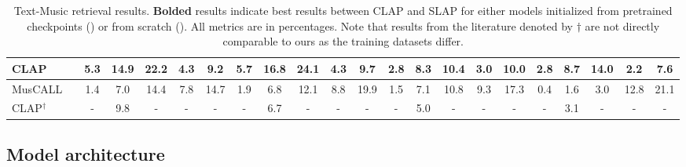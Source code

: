 \documentclass{article}
\newcommand{\redcross}{\textcolor{red}{\ding{55}}} %
\newcommand{\greencheck}{\textcolor{green}{\ding{51}}} %
\begin{document}
\begin{table}[t]
{\begin{tabular}{lcccccccccccccccccccccc}
CLAP &     \greencheck       &  & 5.3 & 14.9  & 22.2 &  4.3   & \multicolumn{1}{c|}{9.2} & 5.7 & 16.8 & 24.1 &  4.3   & \multicolumn{1}{c|}{\textbf{9.7}} & 2.8 & 8.3 &     10.4 &  3.0   & \multicolumn{1}{c|}{10.0}     & 2.8  & 8.7 & 14.0 & 2.2 & \textbf{7.6} \\
\midrule
\multicolumn{2}{l}{MusCALL \cite{manco2022contrastive}} &  &
1.4 & 7.0 & 14.4 & 7.8 &  \multicolumn{1}{c|}{14.7} & 1.9 & 6.8 & 12.1 & 8.8 & \multicolumn{1}{c|}{19.9} &  1.5     &  7.1   &  10.8  & 9.3  & \multicolumn{1}{c|}{17.3 }     &  0.4   &  1.6  &  3.0  & 12.8 & 21.1 \\
\multicolumn{2}{l}{CLAP$^\dagger$ \cite{wu2023large,wu2024collap}}            &  &    -     &   9.8     &       -  &   -  & \multicolumn{1}{c|}{-}     &  -       &  6.7      &   -      &   -  & \multicolumn{1}{c|}{-}     &   -      &     5.0   &   -      &  -   & \multicolumn{1}{c|}{-}     &   -      &    3.1    &    -     &       -        &       -        \\


\bottomrule
\end{tabular}%
}
\caption{
    Text-Music retrieval results. \textbf{Bolded} results indicate best results between CLAP and SLAP for either models initialized from pretrained checkpoints (\greencheck) or from scratch (\redcross). All metrics are in percentages.
    Note that results from the literature denoted by $\dagger$ are not directly comparable to ours as the training datasets differ. %
}
\label{tab:music-results}
\end{table}

\subsection{Model architecture}
\end{document}
